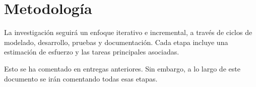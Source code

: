 \section{Metodología}

La investigación seguirá un enfoque iterativo e incremental, a través de ciclos de modelado, desarrollo, pruebas y documentación. Cada etapa incluye una estimación de esfuerzo y las tareas principales asociadas.

Esto se ha comentado en entregas anteriores. Sin embargo, a lo largo de este documento se irán comentando todas esas etapas.

